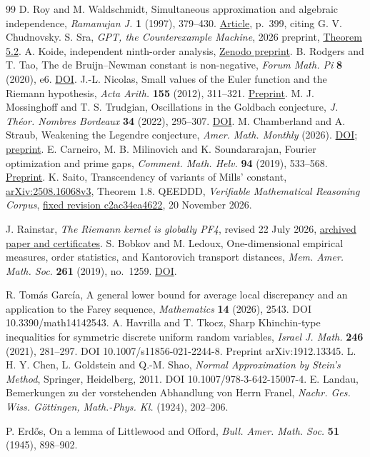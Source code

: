 \documentclass[11pt,a4paper]{article}
\begin{document}
\begin{thebibliography}{99}
 D. Roy and M. Waldschmidt, Simultaneous approximation and algebraic independence, \emph{Ramanujan J.} \textbf{1} (1997), 379--430. \href{https://webusers.imj-prg.fr/~michel.waldschmidt/articles/pdf/RoyWaldschmidtRamaJ1.pdf}{Article}, p.~399, citing G. V. Chudnovsky.
 S. Sra, \emph{GPT, the Counterexample Machine}, 2026 preprint, \href{https://arxiv.org/html/2608.29595v1}{Theorem 5.2}. A. Koide, independent ninth-order analysis, \href{https://doi.org/10.5281/zenodo.21944522}{Zenodo preprint}.
 B. Rodgers and T. Tao, The de Bruijn--Newman constant is non-negative, \emph{Forum Math. Pi} \textbf{8} (2020), e6. \href{https://doi.org/10.1017/fmp.2020.6}{DOI}.
 J.-L. Nicolas, Small values of the Euler function and the Riemann hypothesis, \emph{Acta Arith.} \textbf{155} (2012), 311--321. \href{https://arxiv.org/pdf/1202.0729}{Preprint}.
 M. J. Mossinghoff and T. S. Trudgian, Oscillations in the Goldbach conjecture, \emph{J. Th\'eor. Nombres Bordeaux} \textbf{34} (2022), 295--307. \href{https://doi.org/10.5802/jtnb.1202}{DOI}.
 M. Chamberland and A. Straub, Weakening the Legendre conjecture, \emph{Amer. Math. Monthly} (2026). \href{https://doi.org/10.1080/00029890.2026.2694309}{DOI}; \href{https://arxiv.org/abs/2602.22502}{preprint}.
 E. Carneiro, M. B. Milinovich and K. Soundararajan, Fourier optimization and prime gaps, \emph{Comment. Math. Helv.} \textbf{94} (2019), 533--568. \href{https://arxiv.org/abs/1708.04122}{Preprint}.
 K. Saito, Transcendency of variants of Mills' constant, \href{https://arxiv.org/html/2508.16068v3}{arXiv:2508.16068v3}, Theorem 1.8.
 QEEDDD, \emph{Verifiable Mathematical Reasoning Corpus},
\href{https://github.com/QEEDDD/Verifiable-Mathematical-Reasoning-Corpus/tree/c2ac34ea4622778187173f41bb1996deee8081b7}{fixed revision c2ac34ea4622}, 20 November 2026.


 J. Rainstar, \emph{The Riemann kernel is globally PF4}, revised 22 July 2026, \href{https://doi.org/10.5281/zenodo.21487371}{archived paper and certificates}.
 S. Bobkov and M. Ledoux, One-dimensional empirical measures, order statistics, and Kantorovich transport distances, \emph{Mem. Amer. Math. Soc.} \textbf{261} (2019), no.~1259. \href{https://doi.org/10.1090/memo/1259}{DOI}.

R. Tom\'as Garc\'ia, A general lower bound for average local discrepancy and an application to the Farey sequence, \emph{Mathematics} \textbf{14} (2026), 2543. DOI 10.3390/math14142543.
A. Havrilla and T. Tkocz, Sharp Khinchin-type inequalities for symmetric discrete uniform random variables, \emph{Israel J. Math.} \textbf{246} (2021), 281--297. DOI 10.1007/s11856-021-2244-8. Preprint arXiv:1912.13345.
L. H. Y. Chen, L. Goldstein and Q.-M. Shao, \emph{Normal Approximation by Stein's Method}, Springer, Heidelberg, 2011. DOI 10.1007/978-3-642-15007-4.
E. Landau, Bemerkungen zu der vorstehenden Abhandlung von Herrn Franel, \emph{Nachr. Ges. Wiss. G\"ottingen, Math.-Phys. Kl.} (1924), 202--206.

P. Erd\H{o}s, On a lemma of Littlewood and Offord, \emph{Bull. Amer. Math. Soc.} \textbf{51} (1945), 898--902.

\end{thebibliography}
\end{document}
